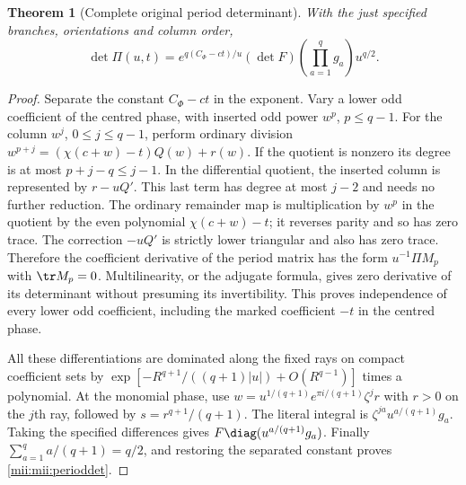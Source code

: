\documentclass[11pt,a4paper]{article}
\newtheorem{theorem}{Theorem}[section]
\begin{document}
\begin{theorem}[Complete original period determinant]\label{mii:mii:periodtheorem}
With the just specified branches, orientations and column order,
\begin{equation}\tag{MII27}\label{mii:mii:perioddet}
 \det\Pi(u,t)=
 e^{q(C_\Phi-ct)/u}(\det F)
                 \left(\prod_{a=1}^qg_a\right)u^{q/2}.
\end{equation}
\end{theorem}
\begin{proof}
Separate the constant $C_\Phi-ct$ in the exponent. Vary a lower
odd coefficient of the centred phase, with inserted odd power
$w^p$, $p\le q-1$. For the column $w^j$, $0\le j\le q-1$,
perform ordinary division
$w^{p+j}=(\chi(c+w)-t)Q(w)+r(w)$. If the quotient is nonzero
its degree is at most $p+j-q\le j-1$. In the differential
quotient, the inserted column is represented by
$r-uQ'$. This last term has degree at most $j-2$ and needs no
further reduction. The ordinary remainder map is multiplication
by $w^p$ in the quotient by the even polynomial $\chi(c+w)-t$;
it reverses parity and so has zero trace. The correction
$-uQ'$ is strictly lower triangular and also has zero trace.
Therefore the coefficient derivative of the period matrix has
the form $u^{-1}\Pi M_p$ with $\tr M_p=0$. Multilinearity, or
the adjugate formula, gives zero derivative of its determinant
without presuming its invertibility. This proves independence
of every lower odd coefficient, including the marked coefficient
$-t$ in the centred phase.

All these differentiations are dominated along the fixed rays
on compact coefficient sets by
$\exp[-R^{q+1}/((q+1)|u|)+O(R^{q-1})]$ times a polynomial.
At the monomial phase, use
$w=u^{1/(q+1)}e^{\pi i/(q+1)}\zeta^j r$ with $r>0$ on the
$j$th ray, followed by $s=r^{q+1}/(q+1)$. The literal integral
is $\zeta^{ja}u^{a/(q+1)}g_a$. Taking the specified differences
gives $F\diag(u^{a/(q+1)}g_a)$. Finally
$\sum_{a=1}^q a/(q+1)=q/2$, and restoring the separated
constant proves \eqref{mii:mii:perioddet}.
\end{proof}
\end{document}
